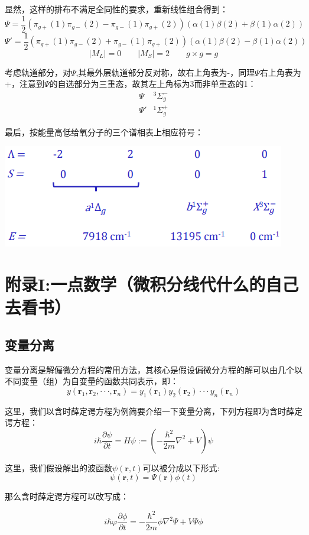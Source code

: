 显然，这样的排布不满足全同性的要求，重新线性组合得到：
\[\Psi=\frac{1}{2}(\pi_{g+}(1)\pi_{g-}(2)-\pi_{g-}(1)\pi_{g+}(2))(\alpha(1)\beta(2)+\beta(1)\alpha(2))\]
\[\Psi'=\frac{1}{2}(\pi_{g+}(1)\pi_{g-}(2)+\pi_{g-}(1)\pi_{g+}(2))(\alpha(1)\beta(2)-\beta(1)\alpha(2))\]
\[|M_L|=0 \qquad |M_S|=2 \qquad g \times g=g\]

考虑轨道部分，对$\Psi$,其最外层轨道部分反对称，故右上角表为-，同理$\Psi$右上角表为+，注意到$\Psi$的自选部分为三重态，故其左上角标为3而非单重态的1：
\[
    \begin{array}{ll}
        \Psi & ^3\Sigma_g^- \\
        \Psi' & ^1\Sigma_g^+ 
    \end{array}
\]

最后，按能量高低给氧分子的三个谱相表上相应符号：
\begin{center}
    \includegraphics{fig/lzhx/微信图片_20211106140136.png}
\end{center}

\section{附录I:一点数学（微积分线代什么的自己去看书）}
\subsection{变量分离}
变量分离是解偏微分方程的常用方法，其核心是假设偏微分方程的解可以由几个以不同变量（组）为自变量的函数共同表示，即：
\[y(\bm{r}_1,\bm{r}_2,\cdot\cdot\cdot,\bm{r}_n)=y_1(\bm{r}_1)y_2(\bm{r}_2)\cdot\cdot\cdot y_n(\bm{r}_n)\]

这里，我们以含时薛定谔方程为例简要介绍一下变量分离，下列方程即为含时薛定谔方程：
\[i \hbar \frac{\partial \psi}{\partial t} =\hat{H}\psi:=\left (-\frac{\hbar^2}{2m}\nabla^2+V \right ) \psi\]

这里，我们假设解出的波函数$\psi(\bm{r},t)$可以被分成以下形式:
\[\psi(\bm{r},t)=\varPsi(\bm{r})\phi(t)\]

那么含时薛定谔方程可以改写成：

\[i \hbar \varphi \frac{\partial \phi}{\partial t}= -\frac{\hbar^2}{2m} \phi \nabla^2 \varPsi+V\varPsi\phi\]


